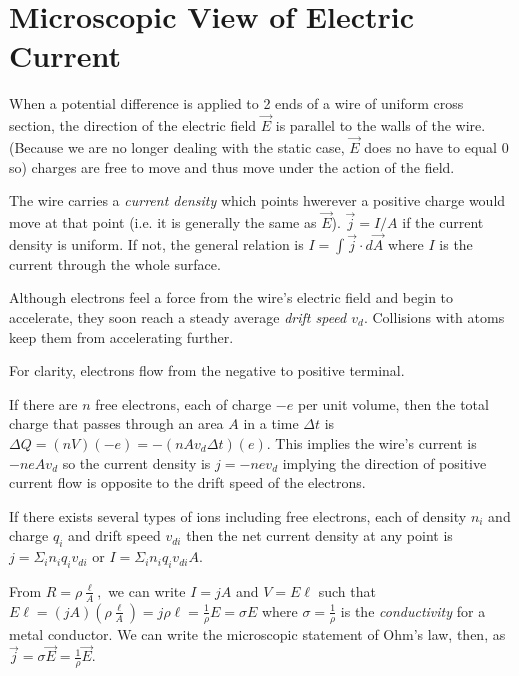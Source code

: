 \section{Microscopic View of Electric Current}

\begin{remark}
    When a potential difference is applied to 2 ends of a wire of uniform cross section, the direction of the electric field $\vec{E}$ is parallel to the walls of the wire. (Because we are no longer dealing with the static case, $\vec{E}$ does no have to equal 0 so) charges are free to move and thus move under the action of the field.
\end{remark}
\begin{definition}
    The wire carries a \emph{current density} which points hwerever a positive charge would move at that point (i.e. it is generally the same as $\vec{E}$). $\vec{j} = I/A$ if the current density is uniform. If not, the general relation is $I = \int \vec{j}\cdot d\vec{A}$ where $I$ is the current through the whole surface.
\end{definition}
\begin{definition}
    Although electrons feel a force from the wire's electric field and begin to accelerate, they soon reach a steady average \emph{drift speed $v_d$}. Collisions with atoms keep them from accelerating further. 
\end{definition}
\begin{note}
    For clarity, electrons flow from the negative to positive terminal.
\end{note}
\begin{remark}
    If there are $n$ free electrons, each of charge $-e$ per unit volume, then the total charge that passes through an area $A$ in a time $\Delta t$ is $\Delta Q = (nV)(-e) = -(nAv_d\Delta t)(e).$ This implies the wire's current is $-neAv_d$ so the current density is $j = -nev_d$ implying the direction of positive current flow is opposite to the drift speed of the electrons. 

    If there exists several types of ions including free electrons, each of density $n_i$ and charge $q_i$ and drift speed $v_{di}$ then the net current density at any point is $j = \Sigma_i n_iq_iv_{di}$ or $I = \Sigma_i n_iq_iv_{di}A$.
\end{remark}
\begin{remark}[Conductivity]
    From $R = \rho\frac{\ell}{A},$ we can write $I = jA$ and $V = E\ell$ such that $E\ell = (jA)(\rho\frac{\ell}{A}) = j\rho\ell = \frac{1}{\rho}E = \sigma E$ where $\sigma = \frac{1}{\rho}$ is the \emph{conductivity} for a metal conductor. We can write the microscopic statement of Ohm's law, then, as $\vec{j}=\sigma\vec{E}=\frac{1}{\rho}\vec{E}.$
\end{remark}

